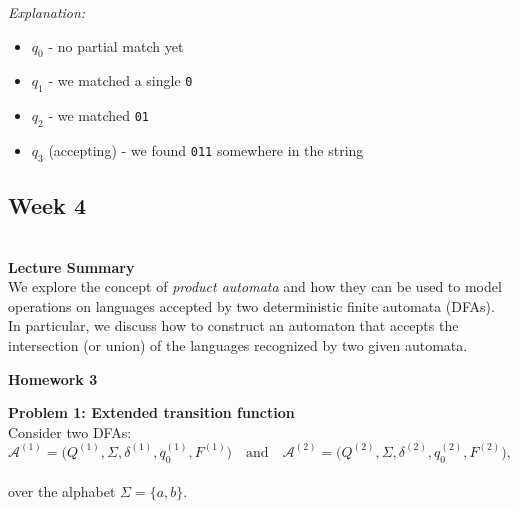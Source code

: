 \documentclass{article}
\theoremstyle{theorem}
\theoremstyle{definition}
\theoremstyle{remark}
\begin{document}
\noindent
\textit{Explanation:}
\begin{itemize}
\item $q_0$ - no partial match yet
\item $q_1$ - we matched a single \texttt{0}
\item $q_2$ - we matched \texttt{01}
\item $q_3$ (accepting) - we found \texttt{011} somewhere in the string
\end{itemize}
\bigskip

\subsection{\textbf{Week 4}}\\
\textbf{Lecture Summary}\\
We explore the concept of \emph{product automata} and how they can be used to model operations on languages accepted by two deterministic finite automata (DFAs). In particular, we discuss how to construct an automaton that accepts the intersection (or union) of the languages recognized by two given automata.

\textbf{Homework 3}

\textbf{Problem 1: Extended transition function}\\
Consider two DFAs:
\[
\mathcal{A}^{(1)} = \big(Q^{(1)}, \Sigma, \delta^{(1)}, q_0^{(1)}, F^{(1)}\big) \quad \text{and} \quad \mathcal{A}^{(2)} = \big(Q^{(2)}, \Sigma, \delta^{(2)}, q_0^{(2)}, F^{(2)}\big),
\] 
\\over the alphabet $\Sigma = \{a, b\}$.
\begin{center}
\end{center}
\end{document}
